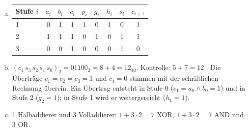 \begin{myexercise}
\begin{myanswer}
\begin{enumerate}[(a)]
            \item \phantom{x}
            \begin{center}
                \begin{tabular}{lcccccccc}
                    Stufe $i$ & $a_i$ & $b_i$ & $c_i$ & $p_i$ & $g_i$ & $h_i$ & $s_i$ & $c_{i+1}$ \\ \midrule
                    1 & 0 & 1 & 1 & 1 & 0 & 1 & 0 & 1 \\
                    2 & 1 & 1 & 1 & 0 & 1 & 0 & 1 & 1 \\
                    3 & 0 & 0 & 1 & 0 & 0 & 0 & 1 & 0 \\
                \end{tabular}
            \end{center}
            {\def\RCAinput#1#2{$#1_{#2} = \ifx a#1\ifcase#2 1\or 0\or 1\or 0\fi\else\ifcase#2 1\or 1\or 1\or 0\fi\fi$}%
             \def\RCAcarry#1{$c_{#1} = \mathbf{\ifnum#1=4 0\else 1\fi}$}%
             \def\RCAsum#1{$s_{#1} = \mathbf{\ifnum#1>1 1\else 0\fi}$}%
             \begin{center}
                 \scalebox{0.9}{}
             \end{center}}
            \item $(c_4\,s_3\,s_2\,s_1\,s_0)_2 = 01100_2 = 8 + 4 = 12_{10}$. Kontrolle: $5 + 7 = 12$ \checkmark. Die Überträge $c_1 = c_2 = c_3 = 1$ und $c_4 = 0$ stimmen mit der schriftlichen Rechnung überein. Ein Übertrag entsteht in Stufe 0 ($c_1 = a_0 \land b_0 = 1$) und in Stufe 2 ($g_2 = 1$); in Stufe 1 wird er weitergereicht ($h_1 = 1$).
            \item 1 Halbaddierer und 3 Volladdierer: $1 + 3 \cdot 2 = 7$ XOR, $1 + 3 \cdot 2 = 7$ AND und $3$ OR.
        \end{enumerate}
    \end{myanswer}
\end{myexercise}


